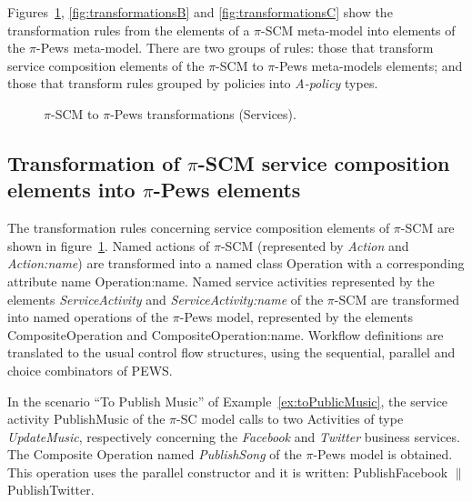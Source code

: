 
Figures~\ref{fig:transformationsA}, \ref{fig:transformationsB} and \ref{fig:transformationsC} show the transformation rules from the elements of a $\pi$-SCM meta-model into elements of the $\pi$-{\sc Pews} meta-model. 
There are two groups of rules: those that transform service composition elements of the $\pi$-SCM to $\pi$-{\sc Pews} meta-models elements; and those that transform rules grouped by policies into {\em A-policy} types.
\begin{figure}
\caption{ $\pi$-SCM to $\pi$-{\sc Pews} transformations (Services).}
\label{fig:transformationsA}
\end{figure}


\subsection{Transformation of $\pi$-SCM service composition elements into $\pi$-{\sc Pews} elements}

The transformation rules concerning service composition elements of $\pi$-SCM are shown in figure~\ref{fig:transformationsA}.
Named actions of $\pi$-SCM (represented by {\sc\em Action} and {\sc\em Action:name}) are transformed into a named class {\sc Operation} with a corresponding attribute name {\sc Operation:name}. 
Named service activities represented by the elements {\sc\em ServiceActivity}  and  {\sc\em ServiceActivity:name} of the $\pi$-SCM are transformed into named operations of the $\pi$-{\sc Pews} model, represented by the elements {\sc CompositeOperation} and {\sc CompositeOperation:name}. 
Workflow definitions are translated to the usual control flow structures, using the sequential, parallel and choice combinators of PEWS.

\begin{example}
In the scenario ``To Publish Music'' of Example~\ref{ex:toPublicMusic}, the service activity {\sf PublishMusic} of the $\pi$-SC model calls to two {\sf Activities} of type {\em UpdateMusic}, respectively concerning the {\em Facebook} and {\em Twitter} business services. 
The {\sf Composite Operation} named {\em PublishSong} of the $\pi$-{\sc Pews} model is obtained.
This operation uses the parallel constructor and it is written: {\sf PublishFacebook} $\parallel$ {\sf PublishTwitter}.
\end{example}


